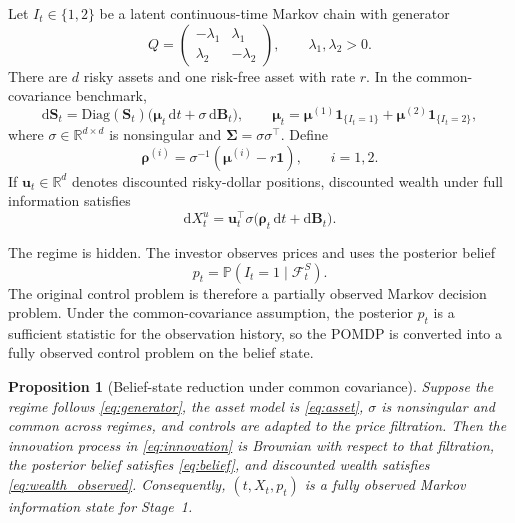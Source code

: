\documentclass[a4paper,10pt]{article}
\newtheorem{proposition}{Proposition}
\newcommand{\Pbb}{\mathbb{P}}
\newcommand{\R}{\mathbb{R}}
\newcommand{\F}{\mathcal{F}}
\newcommand{\dd}{\mathrm{d}}
\newcommand{\bmu}{\bm{\mu}}
\newcommand{\bu}{\bm{u}}
\newcommand{\bSigma}{\bm{\Sigma}}
\newcommand{\brho}{\bm{\rho}}
\newcommand{\bone}{\bm{1}}
\newcommand{\bB}{\bm{B}}
\newcommand{\bS}{\bm{S}}
\begin{document}
Let $I_t\in\{1,2\}$ be a latent continuous-time Markov chain with generator
\begin{equation}
Q=
\begin{pmatrix}
-\lambda_1 & \lambda_1\\
\lambda_2 & -\lambda_2
\end{pmatrix},
\qquad \lambda_1,\lambda_2>0.
\label{eq:generator}
\end{equation}
There are $d$ risky assets and one risk-free asset with rate $r$. In the common-covariance benchmark,
\begin{equation}
\dd\bS_t
=\mathrm{Diag}(\bS_t)\bigl(\bmu_t\,\dd t+\sigma\,\dd\bB_t\bigr),
\qquad
\bmu_t=\bmu^{(1)}\bm{1}_{\{I_t=1\}}+\bmu^{(2)}\bm{1}_{\{I_t=2\}},
\label{eq:asset}
\end{equation}
where $\sigma\in\R^{d\times d}$ is nonsingular and $\bSigma=\sigma\sigma^\top$. Define
\begin{equation}
\brho^{(i)}=\sigma^{-1}(\bmu^{(i)}-r\bone),
\qquad i=1,2.
\end{equation}
If $\bu_t\in\R^d$ denotes discounted risky-dollar positions, discounted wealth under full information satisfies
\begin{equation}
\dd X_t^{u}=\bu_t^\top\sigma\bigl(\brho_t\,\dd t+\dd\bB_t\bigr).
\end{equation}

The regime is hidden. The investor observes prices and uses the posterior belief
\begin{equation}
p_t=\Pbb(I_t=1\mid\F_t^S).
\end{equation}
The original control problem is therefore a partially observed Markov decision problem. Under the common-covariance assumption, the posterior $p_t$ is a sufficient statistic for the observation history, so the POMDP is converted into a fully observed control problem on the belief state.

\begin{proposition}[Belief-state reduction under common covariance]
\label{prop:belief_reduction}
Suppose the regime follows \eqref{eq:generator}, the asset model is \eqref{eq:asset}, $\sigma$ is nonsingular and common across regimes, and controls are adapted to the price filtration. Then the innovation process in \eqref{eq:innovation} is Brownian with respect to that filtration, the posterior belief satisfies \eqref{eq:belief}, and discounted wealth satisfies \eqref{eq:wealth_observed}. Consequently, $(t,X_t,p_t)$ is a fully observed Markov information state for Stage~1.
\end{proposition}
\end{document}
